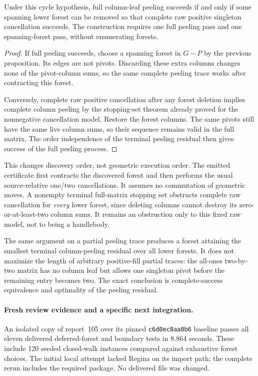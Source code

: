 \begin{proposition}
Under this cycle hypothesis, full column-leaf peeling succeeds if and only
if some spanning lower forest can be removed so that complete raw positive
singleton cancellation succeeds. The construction requires one full
peeling pass and one spanning-forest pass, without enumerating forests.
\end{proposition}
\begin{proof}
If full peeling succeeds, choose a spanning forest in $G-P$ by the previous
proposition. Its edges are not pivots. Discarding these extra columns
changes none of the pivot-column sums, so the same complete peeling trace
works after contracting this forest.

Conversely, complete raw positive cancellation after any forest deletion
implies complete column peeling by the stopping-set theorem already proved
for the nonnegative cancellation model. Restore the forest columns. The
same pivots still have the same live column sums, so their sequence remains
valid in the full matrix. The order independence of the terminal peeling
residual then gives success of the full peeling process.
\end{proof}

This changes discovery order, not geometric execution order. The emitted
certificate first contracts the discovered forest and then performs the
usual source-relative one/two cancellations. It assumes no commutation of
geometric moves. A nonempty terminal full-matrix stopping set obstructs
complete raw cancellation for \emph{every} lower forest, since deleting
columns cannot destroy its zero-or-at-least-two column sums. It remains an
obstruction only to this fixed raw model, not to being a handlebody.

The same argument on a partial peeling trace produces a forest attaining
the smallest terminal column-peeling residual over all lower forests.
It does not maximize the length of arbitrary positive-fill partial traces:
the all-ones two-by-two matrix has no column leaf but allows one singleton
pivot before the remaining entry becomes two. The exact conclusion is
complete-success equivalence and optimality of the peeling residual.

\paragraph{Fresh review evidence and a specific next integration.}
An isolated copy of report~105 over its pinned
\texttt{c6d0ec8aa0b6} baseline passes all eleven delivered deferred-forest
and boundary tests in 8.864 seconds. These include 120 seeded closed-walk
instances compared against exhaustive forest choices. The initial local
attempt lacked Regina on its import path; the complete rerun includes the
required package. No delivered file was changed.


